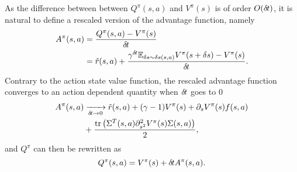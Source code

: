 As the difference between between $Q^\pi(s, a)$ and $V^\pi(s)$ is of order
$O({\delta\hspace{-.1em}t})$, it is natural to define a rescaled version of the advantage
function, namely
\begin{align}
	A^\pi(s, a) &= \frac{Q^\pi(s,a) - V^\pi(s)}{{\delta\hspace{-.1em}t}}\\
		    &= \tilde{r}(s, a) +
		    \frac{\gamma^{{\delta\hspace{-.1em}t}} \mathbb{E}_{\delta s \sim \delta s(s, a)} V^\pi(s + \delta s) - V^\pi(s)}{{\delta\hspace{-.1em}t}}.
    \label{eq:adv}
\end{align}
Contrary to the action state value function, the rescaled advantage function converges
to an action dependent quantity when ${\delta\hspace{-.1em}t}$ goes to $0$
\begin{align}
	A^\pi(s, a) &\xrightarrow[{\delta\hspace{-.1em}t} \to 0]{} \tilde{r}(s, a) +
	(\gamma - 1) V^\pi(s) + \partial_s V^\pi(s) f(s, a)\nonumber\\
		    &+
	\frac{\text{tr}\left(\Sigma^T(s, a)\partial^2_{s^2}V^\pi(s) \Sigma(s,a)\right)}{2},
\end{align}
and $Q^\pi$ can then be rewritten as
\begin{equation}
	Q^\pi(s, a) = V^\pi(s) + {\delta\hspace{-.1em}t} A^\pi(s, a).
	\label{eq:reparam_q_pi}
\end{equation}

